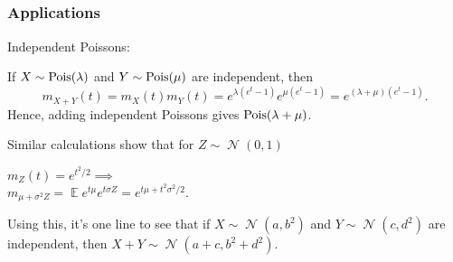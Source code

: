 \documentclass[aspectratio=169,xcolor={table,dvipsnames}]{beamer}
\newcommand{\cblu}[1]{{\color{myblue}#1}}
\def\EE{\mathop{{}\mathbb{E}}}
\newcommand{\ds}{\displaystyle}
\def\Pois{\mathop{\rm Pois}}
\def\NormDist{\mathop{\mathcal{N}}}
\begin{document}
\begin{frame}
  \section{}
  \frametitle{Applications} 
\cblu{Independent Poissons: 

If $X\sim \Pois(\lambda )$ and $Y\sim \Pois (\mu )$ are independent, then 
\[
m_{X+Y}(t) = m_{X}(t)m_{Y}(t) = e^{\lambda(e^{t}-1)}e^{\mu (e^{t}-1)} = e^{(\lambda +\mu)
(e^{t}-1)}. 
\]
\pause
Hence, adding independent Poissons gives $\Pois (\lambda +\mu)$.  
\pause

Similar calculations show that for $Z\sim \NormDist (0,1)$

$\ds m_{Z}(t) = e^{t^{2}/2} \implies $\\ 
$\ds m_{\mu +\sigma^{2}Z} = \EE e^{t\mu}e^{t\sigma Z} = e^{t\mu +t^{2}\sigma^{2}/2}$. 

Using this, it's one line to see that if $X\sim \NormDist (a,b^{2})$ and $Y\sim \NormDist
(c,d^{2})$ are independent, then $X+Y\sim \NormDist (a+c,b^{2}+d^{2})$.  
}
\vskip 5in
\end{frame}

\end{document}
